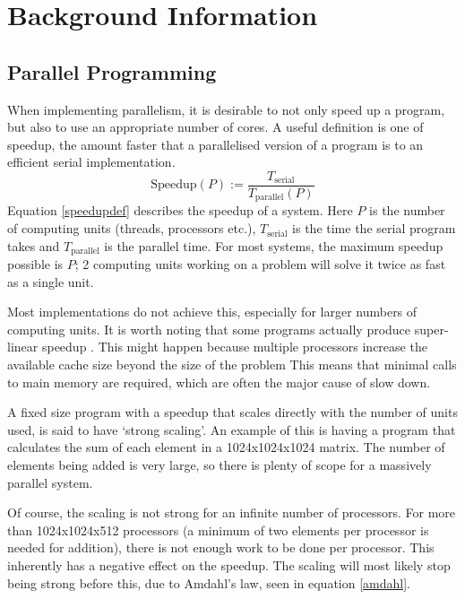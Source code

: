 \documentclass[../main.tex]{subfiles}
\begin{document}
  \section{Background Information}
    \subsection{Parallel Programming}
    When implementing parallelism, it is desirable to not only speed up a program, but also to use an appropriate number of cores.
    A useful definition is one of speedup, the amount faster that a parallelised version of a program is to an efficient serial implementation.
    \begin{equation}
      \text{Speedup}(P) := \frac{T_\text{serial}}{T_\text{parallel}(P)}
      \label{speedupdef}
    \end{equation}
    Equation \ref{speedupdef} describes the speedup of a system.
    Here $P$ is the number of computing units (threads, processors etc.), $T_\text{serial}$ is the time the serial program takes and $T_\text{parallel}$ is the parallel time.
    For most systems, the maximum speedup possible is $P$; 2 computing units working on a problem will solve it twice as fast as a single unit. 

    Most implementations do not achieve this, especially for larger numbers of computing units.
    It is worth noting that some programs actually produce super-linear speedup \cite{superlinear}.
    This might happen because multiple processors increase the available cache size beyond the size of the problem
    This means that minimal calls to main memory are required, which are often the major cause of slow down.

    A fixed size program with a speedup that scales directly with the number of units used, is said to have `strong scaling'.
    An example of this is having a program that calculates the sum of each element in a 1024x1024x1024 matrix.
    The number of elements being added is very large, so there is plenty of scope for a massively parallel system.

    Of course, the scaling is not strong for an infinite number of processors.
    For more than 1024x1024x512 processors (a minimum of two elements per processor is needed for addition), there is not enough work to be done per processor.
    This inherently has a negative effect on the speedup.
    The scaling will most likely stop being strong before this, due to Amdahl's law, seen in equation \ref{amdahl}.
\end{document}
